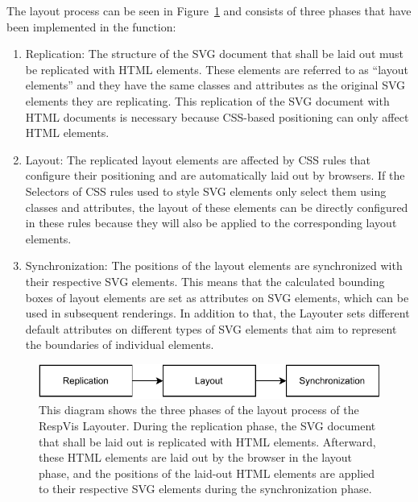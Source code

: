 The layout process can be seen in Figure~\ref{fig:LayoutProcess} and consists of three phases that have been implemented in the  function:
\begin{enumerate}
\item Replication:
The structure of the SVG document that shall be laid out must be replicated with HTML  elements. These elements are referred to as \enquote{layout elements} and they have the same classes and  attributes as the original SVG elements they are replicating.
This replication of the SVG document with HTML documents is necessary because CSS-based positioning can only affect HTML elements.

\item Layout:
The replicated layout elements are affected by CSS rules that configure their positioning and are automatically laid out by browsers. 
If the Selectors of CSS rules used to style SVG elements only select them using classes and  attributes, the layout of these elements can be directly configured in these rules because they will also be applied to the corresponding layout elements.

\item Synchronization:
The positions of the layout elements are synchronized with their respective SVG elements.
This means that the calculated bounding boxes of layout elements are set as  attributes on SVG elements, which can be used in subsequent renderings.
In addition to that, the Layouter sets different default attributes on different types of SVG elements that aim to represent the boundaries of individual elements.
\end{enumerate}

\begin{figure}[tp]
\centering
\includegraphics[keepaspectratio,width=\linewidth,height=\fullh]{diagrams/respvis-layout-process.pdf}
\caption[Layout Process of the Layouter]{
  This diagram shows the three phases of the layout process of the RespVis Layouter. 
  During the replication phase, the SVG document that shall be laid out is replicated with HTML  elements. 
  Afterward, these HTML elements are laid out by the browser in the layout phase, and the positions of the laid-out HTML elements are applied to their respective SVG elements during the synchronization phase.
}
\label{fig:LayoutProcess}
\end{figure}


